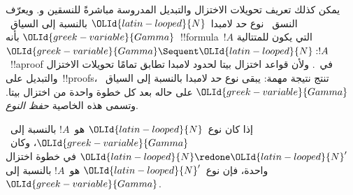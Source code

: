 \documentclass[../../../include/open-logic-section]{subfiles}
\begin{document}


يمكن كذلك تعريف تحويلات الاختزال والتبديل المدروسة مباشرةً للنسقين
 و. ويعرّف النسق~ نوع حد لامبدا~$\OLId{latin-looped}{N}$ بالنسبة
إلى السياق~$\OLId{greek-variable}{Gamma}$ بأنه~!!{formula}~$!A$ التي يكون للمتتالية
$\OLId{greek-variable}{Gamma}\Sequent \OLId{latin-looped}{N}:!A$~!!a{proof} في~. ولأن قواعد اختزال بيتا
لحدود لامبدا تطابق تمامًا تحويلات الاختزال والتبديل على~!!{proof}s، تنتج
نتيجة مهمة: يبقى نوع حد لامبدا بالنسبة إلى السياق~$\OLId{greek-variable}{Gamma}$ على حاله بعد
كل خطوة واحدة من اختزال بيتا. وتسمى هذه الخاصية \emph{حفظ النوع}.

\begin{prop}
إذا كان نوع~$\OLId{latin-looped}{N}$ هو~$!A$ بالنسبة إلى~$\OLId{greek-variable}{Gamma}$، وكان~$\OLId{latin-looped}{N}\redone \OLId{latin-looped}{N}'$ في خطوة
اختزال واحدة، فإن نوع~$\OLId{latin-looped}{N}'$ هو~$!A$ بالنسبة إلى~$\OLId{greek-variable}{Gamma}$.
\end{prop}
\end{document}
